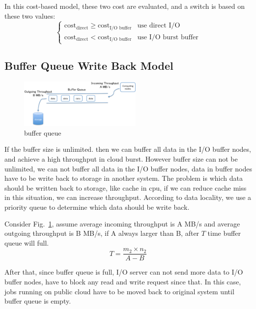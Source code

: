 In this cost-based model, these two cost are evaluated, and a switch is based on these two values:
\begin{equation}
	\begin{cases}
		\text{cost}_{\text{direct}} \geq \text{cost}_{\text{I/O buffer}} & \text{use direct I/O}\\
		\text{cost}_{\text{direct}} < \text{cost}_{\text{I/O buffer}} & \text{use I/O burst buffer}
	\end{cases}
\end{equation}

\subsection{Buffer Queue Write Back Model}

\begin{figure}[tb]
	\centering
	\includegraphics[width=6cm]{../img/buffer_queue}
	\caption{buffer queue}
	\label{buffer queue}
\end{figure}

If the buffer size is unlimited. then we can buffer all data in the I/O buffer nodes, and achieve a high throughput in cloud burst.
However buffer size can not be unlimited, we can not buffer all data in the I/O buffer nodes, data in buffer nodes have to be write back to storage in another system.
The problem is which data should be written back to storage, like cache in cpu, if we can reduce cache miss in this situation, we can increase throughput. 
According to data locality, we use a priority queue to determine which data should be write back.

Consider Fig.~\ref{buffer queue}, assume average incoming throughput is A MB/s and average outgoing throughput is B MB/s, if A always larger than B, after $T$ time buffer queue will full.
\[T=\frac{m_2\times n_2}{A-B}\]

After that, since buffer queue is full, I/O server can not send more data to I/O buffer nodes, have to block any read and write request since that.
In this case, jobs running on public cloud have to be moved back to original system until buffer queue is empty.
